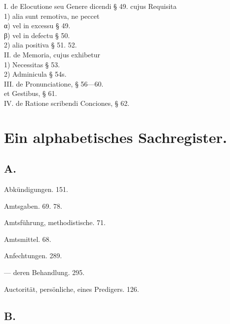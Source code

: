 \begin{flushleft}
\hspace*{1.2em}I. de Elocutione seu Genere dicendi § 49. cujus Requisita\\
\hspace*{2.4em}1) alia sunt remotiva, ne peccet\\
\hspace*{3.6em}α) vel in excessu § 49.\\
\hspace*{3.6em}β) vel in defectu § 50.\\
\hspace*{2.4em}2) alia positiva § 51. 52.\\
\hspace*{1.2em}II. de Memoria, cujus exhibetur\\
\hspace*{2.4em}1) Necessitas § 53.\\
\hspace*{2.4em}2) Adminicula § 54s.\\
\hspace*{1.2em}III. de Pronunciatione, § 56—60.\\
\hspace*{2.4em}et Gestibus, § 61.\\
\hspace*{1.2em}IV. de Ratione scribendi Conciones, § 62.
\end{flushleft}

\section*{Ein alphabetisches Sachregister.}

\subsection*{A.}

Abkündigungen. 151.

Amtsgaben. 69. 78.

Amtsführung, methodistische. 71.

Amtsmittel. 68.

Anfechtungen. 289.

— deren Behandlung. 295.

Auctorität, persönliche, eines Predigers. 126.

\subsection*{B.}

